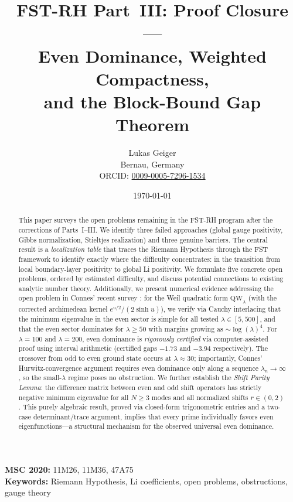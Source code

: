 \documentclass[12pt,a4paper]{article}
\title{FST-RH Part~III: Proof Closure ---\\ Even Dominance, Weighted Compactness,\\ and the Block-Bound Gap Theorem}
\author{Lukas Geiger\\
\small Bernau, Germany\\
\small ORCID: \href{https://orcid.org/0009-0005-7296-1534}{0009-0005-7296-1534}}
\date{\today}
\theoremstyle{definition}
\theoremstyle{remark}
\begin{document}
\maketitle

\begin{abstract}
This paper surveys the open problems remaining in the FST-RH program after the corrections of Parts~I--III. We identify three failed approaches (global gauge positivity, Gibbs normalization, Stieltjes realization) and three genuine barriers. The central result is a \emph{localization table} that traces the Riemann Hypothesis through the FST framework to identify exactly where the difficulty concentrates: in the transition from local boundary-layer positivity to global Li positivity. We formulate five concrete open problems, ordered by estimated difficulty, and discuss potential connections to existing analytic number theory. Additionally, we present numerical evidence addressing the open problem in Connes' recent survey \cite{Connes2025}: for the Weil quadratic form $\mathrm{QW}_\lambda$ (with the corrected archimedean kernel $e^{u/2}/(2\sinh u)$), we verify via Cauchy interlacing that the minimum eigenvalue in the even sector is simple for all tested $\lambda \in [5,500]$, and that the even sector dominates for $\lambda \geq 50$ with margins growing as $\sim\!\log(\lambda)^4$. For $\lambda = 100$ and $\lambda = 200$, even dominance is \emph{rigorously certified} via computer-assisted proof using interval arithmetic (certified gaps $-1.73$ and $-3.94$ respectively). The crossover from odd to even ground state occurs at $\lambda \approx 30$; importantly, Connes' Hurwitz-convergence argument requires even dominance only along a sequence $\lambda_n \to \infty$, so the small-$\lambda$ regime poses no obstruction. We further establish the \emph{Shift Parity Lemma}: the difference matrix between even and odd shift operators has strictly negative minimum eigenvalue for all $N \geq 3$ modes and all normalized shifts $r \in (0,2)$. This purely algebraic result, proved via closed-form trigonometric entries and a two-case determinant/trace argument, implies that every prime individually favors even eigenfunctions---a structural mechanism for the observed universal even dominance.
\end{abstract}

\noindent\textbf{MSC 2020:} 11M26, 11M36, 47A75\\
\textbf{Keywords:} Riemann Hypothesis, Li coefficients, open problems, obstructions, gauge theory

\tableofcontents
\end{document}
